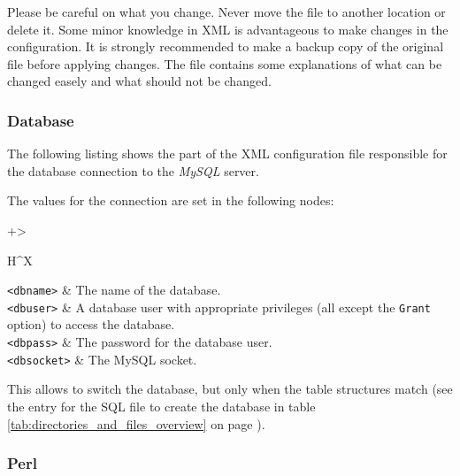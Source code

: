 \documentclass[a4paper,10pt,twoside,titlepage,headings=small,bibliography=totocnumbered,headsepline]{scrartcl}
\begin{document}
\begin{appendix}
Please be careful on what you change. Never move the file to another location or delete it. Some minor knowledge in XML is advantageous to make changes in the configuration. It is strongly recommended to make a backup copy of the original file before applying changes. The file contains some explanations of what can be changed easely and what should not be changed.

\numcodestyle
\lstset{language=XML}    

\subsubsection{Database}
\label{app:configdb}

The following listing shows the part of the XML configuration file responsible for the database connection to the \textit{MySQL} server. 



The values for the connection are set in the following nodes:

\begin{center} 
\begin{tabularx}{\textwidth}{+>{\raggedright\arraybackslash}H^X}
\toprule
\lstinline|<dbname>|	&	The name of the database. \\\midrule
\lstinline|<dbuser>|	&	A database user with appropriate privileges (all except the \lstinline|Grant| option) to access the database. \\\midrule
\lstinline|<dbpass>|	&	The password for the database user. \\\midrule
\lstinline|<dbsocket>|	&	The MySQL socket. \\\midrule
\end{tabularx}
\label{tab:database_config}
\end{center}

This allows to switch the database, but only when the table structures match (see the entry for the SQL file to create the database in table \ref{tab:directories_and_files_overview} on page \pageref{tab:directories_and_files_overview}).

\subsubsection{Perl}
\label{app:configperl}


\end{appendix}
\end{document}
